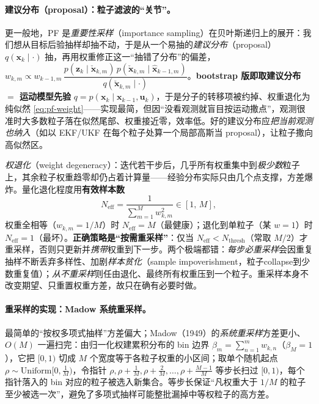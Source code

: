 \paragraph{建议分布（proposal）：粒子滤波的“关节”。}
更一般地，PF 是\emph{重要性采样}（importance sampling）在贝叶斯递归上的展开：我们想从目标后验抽样却抽不动，于是从一个易抽的\emph{建议分布}（proposal）$q(\mathbf{x}_k\mid\cdot)$ 抽，再用权重修正这一“抽错了分布”的偏差，$w_{k,m}\propto w_{k-1,m}\,\dfrac{p(\mathbf{z}_k\mid\check{\mathbf{x}}_{k,m})\,p(\check{\mathbf{x}}_{k,m}\mid\hat{\mathbf{x}}_{k-1,m})}{q(\check{\mathbf{x}}_{k,m}\mid\cdot)}$。\textbf{bootstrap 版即取建议分布 $=$ 运动模型先验} $q=p(\mathbf{x}_k\mid\mathbf{x}_{k-1},\mathbf{u}_k)$，于是分子的转移项被约掉、权重退化为纯似然 \cref{eq:pf-weight}——实现最简，但因“没看观测就盲目按运动撒点”，观测很准时大多数粒子落在似然尾部、权重接近零，效率低\cite{thrun2005probabilistic}。好的建议分布应\emph{把当前观测也纳入}（如以 EKF/UKF 在每个粒子处算一个局部高斯当 proposal），让粒子撒向高似然区。

\begin{pitfall}
\emph{权退化}（weight degeneracy）：迭代若干步后，几乎所有权重集中到\emph{极少数}粒子上，其余粒子权重趋零却仍占着计算量——经验分布实际只由几个点支撑，方差爆炸。量化退化程度用\textbf{有效样本数}\cite{sarkka2013bayesian,thrun2005probabilistic}
\begin{equation}
  N_{\text{eff}}=\frac{1}{\sum_{m=1}^{M}w_{k,m}^2}\in[1,\,M],
  \label{eq:pf-neff}
\end{equation}
权重全相等（$w_{k,m}=1/M$）时 $N_{\text{eff}}=M$（最健康）；退化到单粒子（某 $w=1$）时 $N_{\text{eff}}=1$（最坏）。\textbf{正确策略是“按需重采样”}：仅当 $N_{\text{eff}}<N_{\text{thresh}}$（常取 $M/2$）才重采样，否则只更新并\emph{携带}权重到下一步。两个极端都错：\emph{每步必重采样}会因重复抽样不断丢弃多样性、加剧\emph{样本贫化}（sample impoverishment，粒子collapse到少数重复值）；\emph{从不重采样}则任由退化、最终所有权重压到一个粒子。重采样本身不改变期望、只重置权重方差，故只在确有必要时做。
\end{pitfall}

\paragraph{重采样的实现：Madow 系统重采样。}
最简单的“按权多项式抽样”方差偏大；Madow（1949）的\emph{系统重采样}方差更小、$O(M)$ 一遍扫完\cite{barfoot2024state}：由归一化权建累积分布的 bin 边界 $\beta_m=\sum_{n=1}^{m}w_{k,n}$（$\beta_M=1$），它把 $[0,1)$ 切成 $M$ 个宽度等于各粒子权重的小区间；取单个随机起点 $\rho\sim\mathrm{Uniform}[0,\tfrac1M)$，令指针 $\rho,\rho+\tfrac1M,\rho+\tfrac2M,\dots,\rho+\tfrac{M-1}{M}$ 等步长扫过 $[0,1)$，每个指针落入的 bin 对应的粒子被选入新集合。等步长保证“凡权重大于 $1/M$ 的粒子至少被选一次”，避免了多项式抽样可能整批漏掉中等权粒子的高方差。

